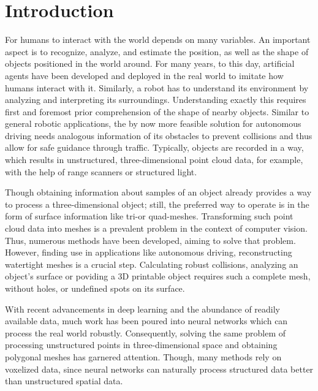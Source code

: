 
\chapter{Introduction}
  For humans to interact with the world depends on many variables. 
  An important aspect is to recognize, analyze, and estimate the position,
  as well as the shape of objects positioned in the world around. For many years,
  to this day, artificial agents have been developed and deployed in the real world\cite{1087032,10.1007978-981-13-0224-4_40} 
  to imitate how humans interact with it. Similarly, a robot has to understand its environment
  by analyzing and interpreting its surroundings. Understanding exactly this requires first and 
  foremost prior comprehension of the shape of nearby objects. 
  Similar to general robotic applications, the by now more feasible solution for autonomous driving
  needs analogous information of its obstacles to prevent collisions and thus allow for safe guidance
  through traffic. 
  Typically, objects are recorded in a way, which results in unstructured, three-dimensional point
  cloud data, for example, with the help of range scanners or structured light.


  Though obtaining information about samples of an object already provides a way to process a three-dimensional object;
  still, the preferred way to operate is in the form of surface information like tri-or quad-meshes.
  Transforming such point cloud data into meshes is a prevalent problem in the context of computer vision. Thus, numerous
  methods have been developed, aiming to solve that problem\cite{817351,Jakob2015Instant}.
  However, finding use in applications like autonomous driving, reconstructing watertight meshes is a crucial step. Calculating robust collisions,
  analyzing an object's surface or poviding a 3D printable object requires such a complete mesh, without holes, or undefined spots on its surface.
 
  With recent advancements in deep learning and the abundance of readily available data, much work has been poured
  into neural networks which can process the real world robustly. Consequently, solving the same problem of processing 
  unstructured points in three-dimensional space and obtaining polygonal meshes has garnered attention. Though, many methods 
  rely on voxelized data, since neural networks can naturally process structured data better than unstructured spatial data.

